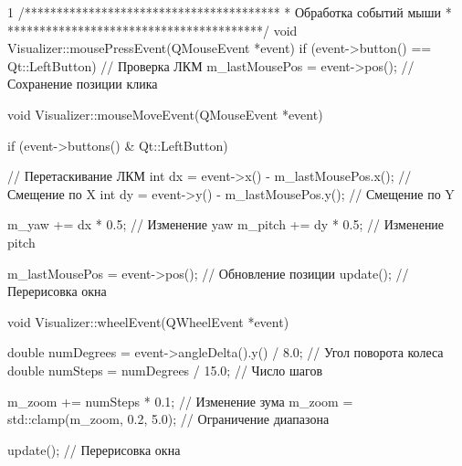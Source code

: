 \begin{listing}{1}
/****************************************
* Обработка событий мыши                *
****************************************/
void Visualizer::mousePressEvent(QMouseEvent *event) {
  if (event->button() == Qt::LeftButton) { // Проверка ЛКМ
    m_lastMousePos = event->pos(); // Сохранение позиции клика
  }
}

void Visualizer::mouseMoveEvent(QMouseEvent *event) {
  if (event->buttons() & Qt::LeftButton) { // Перетаскивание ЛКМ
    int dx = event->x() - m_lastMousePos.x(); // Смещение по X
    int dy = event->y() - m_lastMousePos.y(); // Смещение по Y

    m_yaw += dx * 0.5; // Изменение yaw
    m_pitch += dy * 0.5; // Изменение pitch

    m_lastMousePos = event->pos(); // Обновление позиции
    update(); // Перерисовка окна
  }
}

void Visualizer::wheelEvent(QWheelEvent *event) {
  double numDegrees = event->angleDelta().y() / 8.0; // Угол поворота колеса
  double numSteps = numDegrees / 15.0; // Число шагов

  m_zoom += numSteps * 0.1; // Изменение зума
  m_zoom = std::clamp(m_zoom, 0.2, 5.0); // Ограничение диапазона

  update(); // Перерисовка окна
}

\end{listing}
\normalsize
\pagebreak
